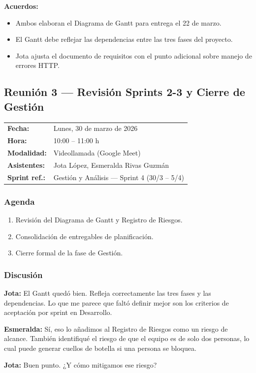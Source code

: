 \documentclass[12pt, a4paper]{article}
\makeatletter
\newcommand{\actaheader}[5]{%
  \begin{mdframed}[
    backgroundcolor=sectionbg,
    linecolor=bordercolor,
    linewidth=1pt,
    innerleftmargin=12pt, innerrightmargin=12pt,
    innertopmargin=10pt, innerbottommargin=10pt,
    skipabove=8pt, skipbelow=8pt
  ]
  \begin{tabularx}{\linewidth}{@{}lX@{}}
    \textbf{Fecha:}       & #1 \\[2pt]
    \textbf{Hora:}        & #2 \\[2pt]
    \textbf{Modalidad:}   & #3 \\[2pt]
    \textbf{Asistentes:}  & #4 \\[2pt]
    \textbf{Sprint ref.:} & #5 \\
  \end{tabularx}
  \end{mdframed}%
}
\newcommand{\jota}[1]{\noindent\textbf{\color{primary}Jota:} #1\par\smallskip}
\newcommand{\esme}[1]{\noindent\textbf{\color{accentgreen}Esmeralda:} #1\par\smallskip}
\makeatother
\begin{document}
\begin{acuerdobox}
\textbf{Acuerdos:}
\begin{itemize}[leftmargin=1.2em, topsep=2pt]
  \item Ambos elaboran el Diagrama de Gantt para entrega el 22 de marzo.
  \item El Gantt debe reflejar las dependencias entre las tres fases del proyecto.
  \item Jota ajusta el documento de requisitos con el punto adicional sobre manejo de errores HTTP.
\end{itemize}
\end{acuerdobox}

\subsection{Reunión 3 — Revisión Sprints 2-3 y Cierre de Gestión}
\actaheader
  {Lunes, 30 de marzo de 2026}
  {10:00 -- 11:00 h}
  {Videollamada (Google Meet)}
  {Jota López, Esmeralda Rivas Guzmán}
  {Gestión y Análisis — Sprint 4 (30/3 -- 5/4)}

\subsubsection*{Agenda}
\begin{enumerate}[leftmargin=1.5em]
  \item Revisión del Diagrama de Gantt y Registro de Riesgos.
  \item Consolidación de entregables de planificación.
  \item Cierre formal de la fase de Gestión.
\end{enumerate}

\subsubsection*{Discusión}

\jota{El Gantt quedó bien. Refleja correctamente las tres fases y las dependencias. Lo que me parece que faltó definir mejor son los criterios de aceptación por sprint en Desarrollo.}

\esme{Sí, eso lo añadimos al Registro de Riesgos como un riesgo de alcance. También identifiqué el riesgo de que el equipo es de solo dos personas, lo cual puede generar cuellos de botella si una persona se bloquea.}

\jota{Buen punto. ¿Y cómo mitigamos ese riesgo?}
\end{document}
